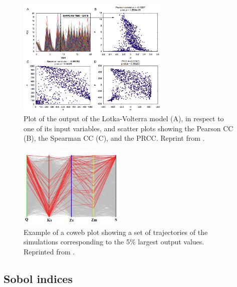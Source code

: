 \documentclass[12pt]{article}
\begin{document}
{%

\begin{figure}[h]
	\centering
	\includegraphics[width=0.65\textwidth]{images/Correlation2.png}
	\caption{Plot of the output of the Lotka-Volterra model (A), in respect to one of its input variables, and scatter plots showing the Pearson CC (B), the Spearman CC (C), and the PRCC. Reprint from \cite{MARINO}.}
	\label{fig:Correlation}
\end{figure}

\begin{figure}[h]
	\centering
	\includegraphics[width=0.45\textwidth]{images/Coweb_plot.png}
	\caption{Example of a coweb plot showing a set of trajectories of the simulations corresponding to the 5\% largest output values. Reprinted from \cite{iooss:hal-00975701}.}
	\label{fig:Coweb_plot}
\end{figure}

\FloatBarrier

\subsection{Sobol indices}
\label{sec:Sobol}

}
\end{document}
